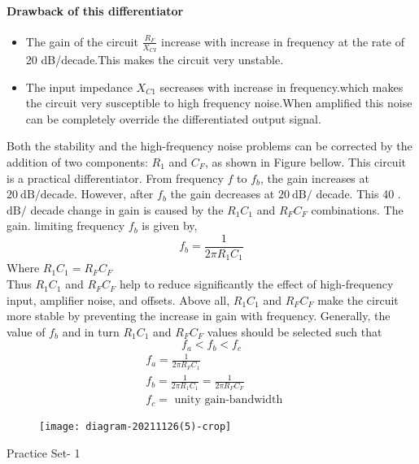    \paragraph{Drawback of this differentiator}
   \begin{note}
   	\begin{itemize}
   		\item The gain of the circuit $\frac{R_F}{X_{CI}}$ increase with increase in frequency at the rate of 20 dB/decade.This makes the circuit very unstable.
   		\item The input impedance $X_{C1}$ secreases with increase in frequency.which makes the circuit very susceptible to high frequency noise.When amplified this noise can be completely override the differentiated output signal.
   	\end{itemize}
   \end{note}
   Both the stability and the high-frequency noise problems can be corrected by the addition of two components: $R_{1}$ and $C_{F}$, as shown in Figure bellow. This circuit is a practical differentiator. From frequency $f$ to $f_{b}$, the gain increases at $20 \mathrm{~dB} / \mathrm{decade}$. However, after $f_{b}$ the gain decreases at $20 \mathrm{~dB} /$ decade. This 40 . $\mathrm{dB} /$ decade change in gain is caused by the $R_{1} C_{1}$ and $R_{F} C_{F}$ combinations. The gain. limiting frequency $f_{b}$ is given by,
   $$f_{b}=\frac{1}{2 \pi R_{1} C_{1}}$$
   Where  $R_{1} C_{1}=R_{F} C_{F}$\\
   Thus $R_{1} C_{1}$ and $R_{F} C_{F}$ help to reduce significantly the effect of high-frequency input, amplifier noise, and offsets. Above all, $R_{1} C_{1}$ and $R_{F} C_{F}$ make the circuit more stable by preventing the increase in gain with frequency. Generally, the value of $f_{b}$ and in turn $R_{1} C_{1}$ and $R_{F} C_{F}$ values should be selected such that
   $$
   f_{a}<f_{b}<f_{c}
   $$
   $$\begin{aligned}
   &f_{a}=\frac{1}{2 \pi R_{F} C_{1}} \\
   &f_{b}=\frac{1}{2 \pi R_{1} C_{1}}=\frac{1}{2 \pi R_{F} C_{F}} \\
   &f_{c}=\text { unity gain-bandwidth }
   \end{aligned}$$
   \begin{figure}[H]
   	\centering
   	\texttt{[image: diagram-20211126(5)-crop]}
   	\caption{}
   	\label{}
   \end{figure}
   \newpage
   \begin{abox}
   Practice Set- 1
   \end{abox}
